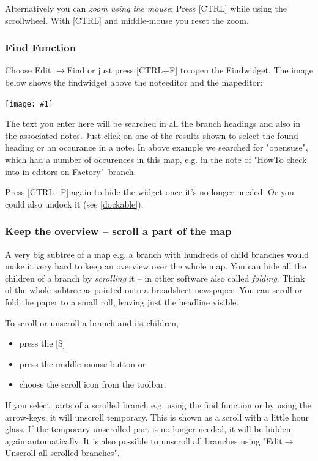 \documentclass[12pt,a4paper]{article}
\newcommand{\maximage}[1]{  
    \begin{center}
        \texttt{[image: \#1]} 
    \end{center}
}
\newcommand{\ra}{$\longrightarrow$}
\newcommand{\key}[1]{[#1]}
\begin{document}
Alternatively you can {\em zoom using the mouse}: Press \key{CTRL} while
using the scrollwheel. With \key{CTRL} and middle-mouse you reset the
zoom.

\subsubsection*{Find Function} \label{findwindow}
Choose Edit \ra Find or just press \key{CTRL+F} to open
the Findwidget. The image below shows the findwidget above the
noteeditor and the mapeditor:
\begin{center}
    \maximage{images/find-window.png}
\end{center}    
The text you enter here will be searched in all the
branch headings and also in the associated notes. Just click on one of
the results shown to select the found heading or an occurance in a note.
In above example we searched for "opensuse", which had a number of
occurences in this map, e.g. in the note of "HowTo check into in
editors on Factory"\ branch.

Press \key{CTRL+F} again to hide the widget once it's no longer needed.
Or you could also undock it (see \ref{dockable}).

\subsubsection*{Keep the overview -- scroll a part of the map}
A very big subtree of a map e.g. a branch with hundreds of child
branches would make it very hard to keep an overview over the whole map.
You can hide all the children of a branch by {\em scrolling} it -- in
other software also called {\em folding}. Think of the whole subtree as
painted onto a broadsheet newspaper. You can scroll or fold the paper to
a small roll, leaving just the headline visible.

To scroll or unscroll a branch and its children,
\begin{itemize}
    \item press the \key{S}
    \item press the middle-mouse button or
    \item choose the scroll icon from the toolbar.
\end{itemize}
If you select parts of a scrolled branch e.g. using the find function or
by using the arrow-keys, it will unscroll temporary. This is shown as a
scroll with a little hour glass. If the temporary unscrolled part is no
longer needed, it will be hidden again automatically. It is also
possible to unscroll all branches using "Edit\ra Unscroll all scrolled
branches".
\end{document}

